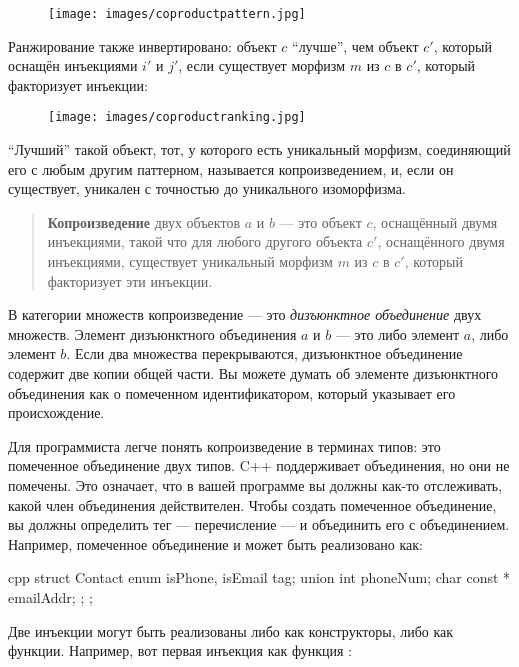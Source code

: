 
\begin{figure}[H]
  \centering
  \texttt{[image: images/coproductpattern.jpg]}
\end{figure}

\noindent
Ранжирование также инвертировано: объект $c$ ``лучше'', чем объект
$c'$, который оснащён инъекциями $i'$ и $j'$,
если существует морфизм $m$ из $c$ в $c'$, который
факторизует инъекции:


\begin{figure}[H]
  \centering
  \texttt{[image: images/coproductranking.jpg]}
\end{figure}

\noindent
``Лучший'' такой объект, тот, у которого есть уникальный морфизм, соединяющий его с
любым другим паттерном, называется копроизведением, и, если он существует, уникален с точностью
до уникального изоморфизма.

\begin{quote}
  \textbf{Копроизведение} двух объектов $a$ и $b$ --- это объект
  $c$, оснащённый двумя инъекциями, такой что для любого другого объекта
  $c'$, оснащённого двумя инъекциями, существует уникальный морфизм
  $m$ из $c$ в $c'$, который факторизует эти инъекции.
\end{quote}

\noindent
В категории множеств копроизведение --- это \emph{дизъюнктное объединение}
двух множеств. Элемент дизъюнктного объединения $a$ и $b$ ---
это либо элемент $a$, либо элемент $b$. Если два множества
перекрываются, дизъюнктное объединение содержит две копии общей части. Вы
можете думать об элементе дизъюнктного объединения как о помеченном
идентификатором, который указывает его происхождение.

Для программиста легче понять копроизведение в терминах
типов: это помеченное объединение двух типов. C++ поддерживает объединения, но они
не помечены. Это означает, что в вашей программе вы должны как-то отслеживать,
какой член объединения действителен. Чтобы создать помеченное объединение, вы
должны определить тег --- перечисление --- и объединить его с
объединением. Например, помеченное объединение  и
 может быть реализовано как:

\begin{snip}{cpp}
struct Contact {
    enum { isPhone, isEmail } tag;
    union { int phoneNum; char const * emailAddr; };
};
\end{snip}
Две инъекции могут быть реализованы либо как конструкторы, либо как
функции. Например, вот первая инъекция как функция
:

